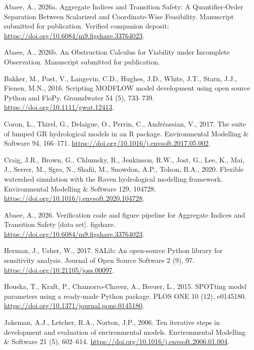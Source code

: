 \documentclass[3p,11pt]{elsarticle}
\begin{document}

\begin{thebibliography}{}
\providecommand{\natexlab}[1]{#1}

Abaee, A., 2026a. Aggregate Indices and Transition Safety: A Quantifier-Order
Separation Between Scalarized and Coordinate-Wise Feasibility. Manuscript
submitted for publication. Verified companion deposit:
\url{https://doi.org/10.6084/m9.figshare.33764023}.

Abaee, A., 2026b. An Obstruction Calculus for Viability under Incomplete
Observation. Manuscript submitted for publication.


Bakker, M., Post, V., Langevin, C.D., Hughes, J.D., White, J.T., Starn,
J.J., Fienen, M.N., 2016. Scripting MODFLOW model development using open
source Python and FloPy. Groundwater 54 (5), 733--739.
\url{https://doi.org/10.1111/gwat.12413}.

Coron, L., Thirel, G., Delaigue, O., Perrin, C., Andr\'eassian, V., 2017.
The suite of lumped GR hydrological models in an R package. Environmental
Modelling \& Software 94, 166--171.
\url{https://doi.org/10.1016/j.envsoft.2017.05.002}.

Craig, J.R., Brown, G., Chlumsky, R., Jenkinson, R.W., Jost, G., Lee, K.,
 Mai, J., Serrer, M., Sgro, N., Shafii, M., Snowdon, A.P., Tolson, B.A.,
 2020. Flexible watershed simulation with the Raven hydrological modelling
 framework. Environmental Modelling \& Software 129, 104728.
 \url{https://doi.org/10.1016/j.envsoft.2020.104728}.

Abaee, A., 2026. Verification code and figure pipeline for Aggregate
Indices and Transition Safety [data set]. figshare.
\url{https://doi.org/10.6084/m9.figshare.33764023}.

Herman, J., Usher, W., 2017. SALib: An open-source Python library for
sensitivity analysis. Journal of Open Source Software 2 (9), 97.
\url{https://doi.org/10.21105/joss.00097}.

Houska, T., Kraft, P., Chamorro-Chavez, A., Breuer, L., 2015. SPOTting
model parameters using a ready-made Python package. PLOS ONE 10 (12),
e0145180. \url{https://doi.org/10.1371/journal.pone.0145180}.

Jakeman, A.J., Letcher, R.A., Norton, J.P., 2006. Ten iterative steps in
development and evaluation of environmental models. Environmental Modelling
\& Software 21 (5), 602--614. \url{https://doi.org/10.1016/j.envsoft.2006.01.004}.


\end{thebibliography}
\end{document}
